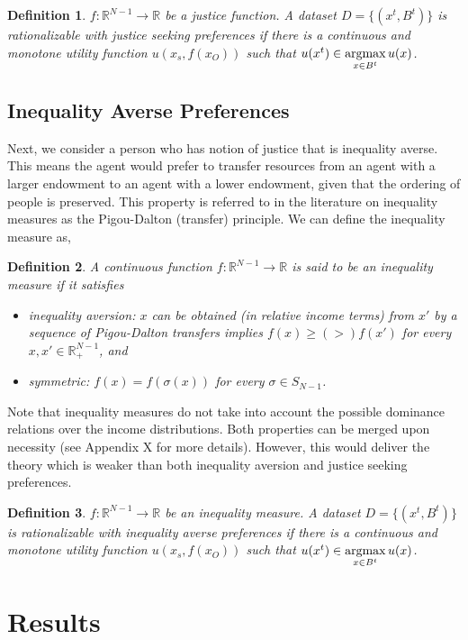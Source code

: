 \documentclass[12pt,dvipsnames]{amsart}
\newtheorem{defn}{Definition}
\newcommand{\R}{\mathbb{R}}
\newcommand{\argmax}{\operatornamewithlimits{argmax}}
\begin{document}
\begin{defn}
\label{def:JS}
$f:\R^{N-1}\rightarrow \R$ be a justice function.
A dataset $D=\{(x^t,B^t)\}$ is rationalizable with justice seeking preferences if there is a continuous and monotone utility function $u(x_s,f(x_O))$ such that $u(x^t) \in \argmax\limits_{x\in B^t} u(x)$.
\end{defn}


\subsection{Inequality Averse Preferences}
Next, we consider a person who has notion of justice that is inequality averse. This means the agent would prefer to transfer resources from an agent with a larger endowment to an agent with a lower endowment, given that the ordering of people is preserved. This property is referred to in the literature on inequality measures as the
Pigou-Dalton (transfer) principle. We can define the inequality
measure as,

\begin{defn}
A continuous function $f:\R^{N-1}\rightarrow \R$ is said to be an inequality measure if it satisfies
\begin{itemize}
	\item inequality aversion: $x$ can be obtained (in relative income terms) from $x'$ by a sequence of Pigou-Dalton transfers implies $f(x)\geq (>) f(x')$ for every $x,x'\in \R^{N-1}_+$, and
	\item symmetric: $f(x)=f(\sigma(x))$ for every $\sigma\in S_{N-1}$.
\end{itemize} 
\end{defn}

Note that inequality measures do not take into account the possible dominance relations over the income distributions. Both
properties can be merged upon necessity (see Appendix X for more
details). However, this would deliver the theory which is weaker than both inequality aversion and justice seeking preferences.

\begin{defn}
\label{def:IA}
$f:\R^{N-1}\rightarrow \R$ be an inequality measure.
A dataset $D=\{(x^t,B^t)\}$ is rationalizable with inequality averse preferences if there is a continuous and monotone utility function $u(x_s,f(x_O))$ such that $u(x^t) \in \argmax\limits_{x\in B^t} u(x)$.
\end{defn}




\section{Results}
\end{document}
